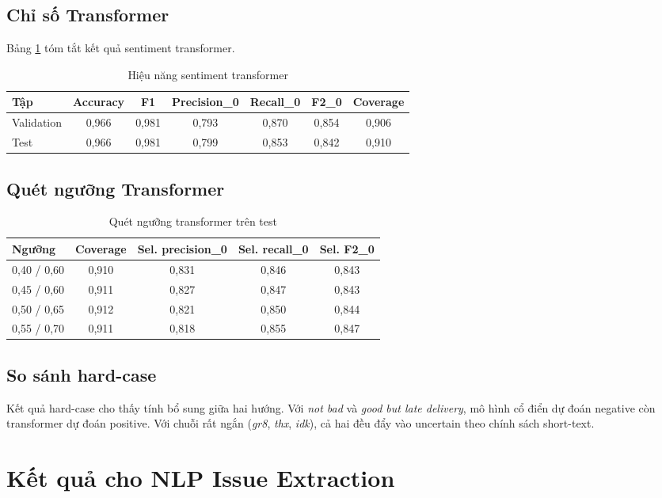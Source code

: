 ﻿\documentclass[12pt,a4paper]{article}
\begin{document}
\subsection{Chỉ số Transformer}
Bảng \ref{tab:tf_metrics_vi} tóm tắt kết quả sentiment transformer.

\begin{table}[H]
\centering
\caption{Hiệu năng sentiment transformer}
\label{tab:tf_metrics_vi}
\begin{tabular}{lcccccc}
\toprule
Tập & Accuracy & F1 & Precision\_0 & Recall\_0 & F2\_0 & Coverage \\
\midrule
Validation & 0,966 & 0,981 & 0,793 & 0,870 & 0,854 & 0,906 \\
Test & 0,966 & 0,981 & 0,799 & 0,853 & 0,842 & 0,910 \\
\bottomrule
\end{tabular}
\end{table}

\subsection{Quét ngưỡng Transformer}
\begin{table}[H]
\centering
\caption{Quét ngưỡng transformer trên test}
\label{tab:tf_threshold_vi}
\begin{tabular}{lcccc}
\toprule
Ngưỡng & Coverage & Sel. precision\_0 & Sel. recall\_0 & Sel. F2\_0 \\
\midrule
0,40 / 0,60 & 0,910 & 0,831 & 0,846 & 0,843 \\
0,45 / 0,60 & 0,911 & 0,827 & 0,847 & 0,843 \\
0,50 / 0,65 & 0,912 & 0,821 & 0,850 & 0,844 \\
0,55 / 0,70 & 0,911 & 0,818 & 0,855 & 0,847 \\
\bottomrule
\end{tabular}
\end{table}

\subsection{So sánh hard-case}
Kết quả hard-case cho thấy tính bổ sung giữa hai hướng. Với \textit{not bad} và \textit{good but late delivery}, mô hình cổ điển dự đoán negative còn transformer dự đoán positive. Với chuỗi rất ngắn (\textit{gr8}, \textit{thx}, \textit{idk}), cả hai đều đẩy vào uncertain theo chính sách short-text.

\section{Kết quả cho NLP Issue Extraction}
\end{document}
